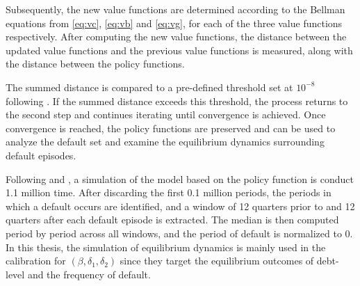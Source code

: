Subsequently, the new value functions are determined according to the Bellman equations from \eqref{eq:vc}, \eqref{eq:vb} and \eqref{eq:vg}, for each of the three value functions respectively. After computing the new value functions, the distance between the updated value functions and the previous value functions is measured, along with the distance between the policy functions.

The summed distance is compared to a pre-defined threshold set at $10^{-8}$ following \citet{Na-18}. If the summed distance exceeds this threshold, the process returns to the second step and continues iterating until convergence is achieved.
Once convergence is reached, the policy functions are preserved and can be used to analyze the default set and examine the equilibrium dynamics surrounding default episodes.

Following \citet{Schmitt-Uribe-16}
and \citet{Na-18}, a simulation of the model based on the policy function is conduct 1.1 million time. After discarding the first 0.1 million periods, the periods in which a default occurs are identified, and a window of 12 quarters prior to and 12 quarters after each default episode is extracted. The median is then computed period by period across all windows, and the period of default is normalized to 0. In this thesis, the simulation of equilibrium dynamics is mainly used in the calibration for $(\beta, \delta_1, \delta_2)$ since they target the equilibrium outcomes of debt-level and the frequency of default.